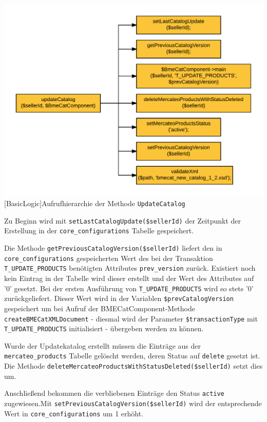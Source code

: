 	\begin{minipage}{\linewidth}
		\vspace{1em}
		\centering
		\includegraphics[width=0.7 \linewidth]{img/updateKatalogAufrufhierarchie}
		[BasicLogic]{Aufrufhierarchie der Methode \texttt{UpdateCatalog}}
		\vspace{1em}
	\end{minipage}
	
	Zu Beginn wird mit \texttt{setLastCatalogUpdate(\$sellerId)} der Zeitpunkt der Erstellung in der \texttt{core\_configurations} Tabelle gespeichert.  
	
	Die Methode \texttt{getPreviousCatalogVersion(\$sellerId)} liefert den in \texttt{core\_configurations} gespeicherten Wert des bei der Transaktion \texttt{T\_UPDATE\_PRODUCTS} benötigten Attributes \texttt{prev\_version} zurück. Existiert noch kein Eintrag in der Tabelle wird dieser erstellt und der Wert des Attributes auf '0' gesetzt. Bei der ersten Ausführung von \texttt{T\_UPDATE\_PRODUCTS} wird so stets '0' zurückgeliefert. Dieser Wert wird in der Variablen \texttt{\$prevCatalogVersion} gespeichert um bei Aufruf der BMECatComponent-Methode \texttt{createBMECatXMLDocument} - diesmal wird der Parameter \texttt{\$transactionType} mit \texttt{T\_UPDATE\_PRODUCTS} initialisiert - übergeben werden zu können.
	
	Wurde der Updatekatalog erstellt müssen die Einträge aus der \texttt{mercateo\_products} Tabelle gelöscht werden, deren Status auf \texttt{delete} gesetzt ist. Die Methode \texttt{deleteMercateoProductsWithStatusDeleted(\$sellerId)} setzt dies um.
	
	Anschließend bekommen die verbliebenen Einträge den Status \texttt{active} zugewiesen.Mit \texttt{setPreviousCatalogVersion(\$sellerId)} wird der entsprechende Wert in \texttt{core\_configurations} um 1 erhöht.
	
